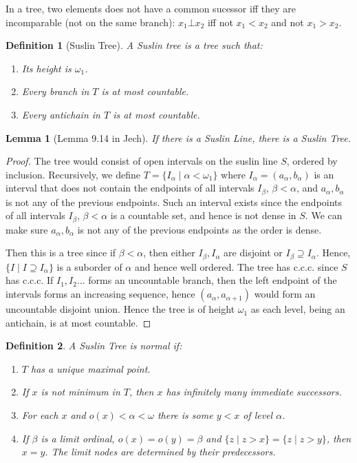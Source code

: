 \documentclass{article}
\newtheorem{definition}{Definition}
\newtheorem{lemma}{Lemma}
\begin{document}
In a tree, two elements does not have a common sucessor iff they are incomparable (not on the same branch): $x_1\bot x_2$ iff not $x_1<x_2$ and not $x_1>x_2$.

\begin{definition}[Suslin Tree]
    A Suslin tree is a tree such that:
    \begin{enumerate}
        \item Its height is $\omega_1$.
        \item Every branch in $T$ is at most countable.
        \item Every antichain in $T$ is at most countable.
    \end{enumerate}
\end{definition}

\begin{lemma}[Lemma 9.14 in Jech]
    If there is a Suslin Line, there is a Suslin Tree.
\end{lemma}

\begin{proof}
    The tree would consist of open intervals on the suslin line $S$, ordered by inclusion. Recursively, we define $T = \{I_\alpha\mid \alpha<\omega_1\}$ where $I_\alpha = (a_\alpha,b_\alpha)$ is an interval that does not contain the endpoints of all intervals $I_\beta$, $\beta<\alpha$, and $a_\alpha,b_\alpha$ is not any of the previous endpoints. Such an interval exists since the endpoints of all intervals $I_\beta$, $\beta<\alpha$ is a countable set, and hence is not dense in $S$. We can make sure $a_\alpha,b_\alpha$ is not any of the previous endpoints as the order is dense.

    Then this is a tree since if $\beta<\alpha$, then either $I_\beta,I_\alpha$ are disjoint or $I_\beta\supseteq I_\alpha$. Hence, $\{I\mid I\supseteq I_\alpha\}$ is a suborder of $\alpha$ and hence well ordered. The tree has c.c.c. since $S$ has c.c.c. If $I_1,I_2\dots$ forms an uncountable branch, then the left endpoint of the intervals forms an increasing sequence, hence $(a_\alpha,a_{\alpha+1})$ would form an uncountable disjoint union. Hence the tree is of height $\omega_1$ as each level, being an antichain, is at most countable.
\end{proof}

\begin{definition}
    A Suslin Tree is normal if:
    \begin{enumerate}
        \item $T$ has a unique maximal point.
        \item If $x$ is not minimum in $T$, then $x$ has infinitely many immediate successors.
        \item For each $x$ and $o(x)<\alpha<\omega$ there is some $y<x$ of level $\alpha$.
        \item If $\beta$ is a limit ordinal, $o(x) = o(y) = \beta$ and $\{z\mid z>x\} = \{z\mid z>y\}$, then $x = y$. The limit nodes are determined by their predecessors.
    \end{enumerate}
\end{definition}
\end{document}
